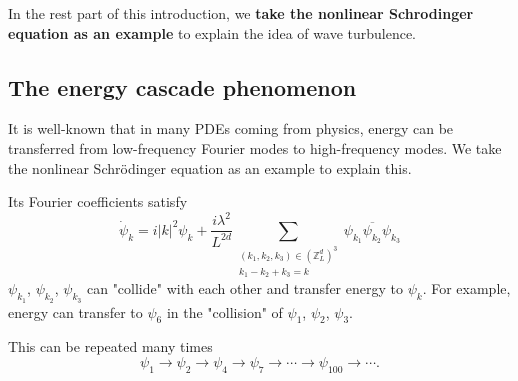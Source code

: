 In the rest part of this introduction, we \textbf{take the nonlinear Schrodinger equation as an example} to explain the idea of wave turbulence. 

\subsection{The energy cascade phenomenon}
It is well-known that in many PDEs coming from physics, energy can be transferred from low-frequency Fourier modes to high-frequency modes. We take the nonlinear Schr\"odinger equation as an example to explain this.

Its Fourier coefficients satisfy
\begin{equation}
\dot{\psi}_{k} =  i|k|^2 \psi_k 
 +\frac{i\lambda^2}{L^{2d}} \sum\limits_{\substack{(k_1,k_2,k_3) \in (\mathbb{Z}^d_L)^3 \\ k_1 - k_2 + k_3 = k}} \psi_{k_1} \overline{\psi_{k_2}} \psi_{k_3}
\end{equation}
$\psi_{k_1}$, $\psi_{k_2}$, $\psi_{k_3}$ can "collide" with each other and transfer energy to $\psi_k$. For example, energy can transfer to $\psi_{6}$ in the "collision" of $\psi_{1}$, $\psi_{2}$, $\psi_{3}$.


This can be repeated many times 
\begin{equation}
    \psi_1\rightarrow \psi_2\rightarrow \psi_4\rightarrow \psi_7\rightarrow \cdots \rightarrow \psi_{100} \rightarrow \cdots.
\end{equation}

